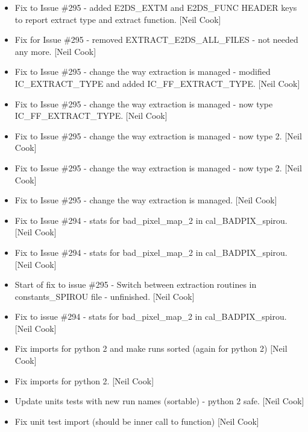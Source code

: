 \documentclass[a4paper,10pt,english]{report}
\begin{document}
\begin{itemize}
\item {} 
Fix to Issue \#295 - added E2DS\_EXTM and E2DS\_FUNC HEADER keys to
report extract type and extract function. {[}Neil Cook{]}

\item {} 
Fix for Issue \#295 - removed EXTRACT\_E2DS\_ALL\_FILES - not needed any
more. {[}Neil Cook{]}

\item {} 
Fix to Issue \#295 - change the way extraction is managed - modified
IC\_EXTRACT\_TYPE and added IC\_FF\_EXTRACT\_TYPE. {[}Neil Cook{]}

\item {} 
Fix to Issue \#295 - change the way extraction is managed - now type
IC\_FF\_EXTRACT\_TYPE. {[}Neil Cook{]}

\item {} 
Fix to Issue \#295 - change the way extraction is managed - now type 2.
{[}Neil Cook{]}

\item {} 
Fix to Issue \#295 - change the way extraction is managed - now type 2.
{[}Neil Cook{]}

\item {} 
Fix to Issue \#295 - change the way extraction is managed. {[}Neil Cook{]}

\item {} 
Fix to Issue \#294 - stats for bad\_pixel\_map\_2 in cal\_BADPIX\_spirou.
{[}Neil Cook{]}

\item {} 
Fix to Issue \#294 - stats for bad\_pixel\_map\_2 in cal\_BADPIX\_spirou.
{[}Neil Cook{]}

\item {} 
Start of fix to issue \#295 - Switch between extraction routines in
constants\_SPIROU file - unfinished. {[}Neil Cook{]}

\item {} 
Fix to issue \#294 - stats for bad\_pixel\_map\_2 in cal\_BADPIX\_spirou.
{[}Neil Cook{]}

\item {} 
Fix imports for python 2 and make runs sorted (again for python 2)
{[}Neil Cook{]}

\item {} 
Fix imports for python 2. {[}Neil Cook{]}

\item {} 
Update units tests with new run names (sortable) - python 2 safe.
{[}Neil Cook{]}

\item {} 
Fix unit test import (should be inner call to function) {[}Neil Cook{]}


\end{itemize}
\end{document}
